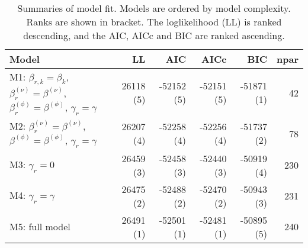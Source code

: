 \begin{table}[ht]
\centering
\begingroup\fontsize{9pt}{10pt}\selectfont
\begin{tabular}{l|rrrrr}
  \hline
Model & LL & AIC & AICc & BIC & npar \\ 
  \hline
M1: $\beta_{r,k} = \beta_{k}$, $\beta_{r}^{(\nu)} = \beta^{(\nu)}$, $\beta_{r}^{(\phi)} = \beta^{(\phi)}$, $\gamma_r = \gamma$ & 26118 (5) & -52152 (5) & -52151 (5) & -51871 (1) & 42 \\ 
  M2: $\beta_{r}^{(\nu)} = \beta^{(\nu)}$, $\beta^{(\phi)} = \beta^{(\phi)}$, $\gamma_r = \gamma$ & 26207 (4) & -52258 (4) & -52256 (4) & -51737 (2) & 78 \\ 
  M3: $\gamma_r = 0$ & 26459 (3) & -52458 (3) & -52440 (3) & -50919 (4) & 230 \\ 
  M4: $\gamma_r = \gamma$ & 26475 (2) & -52488 (2) & -52470 (2) & -50943 (3) & 231 \\ 
  M5: full model & 26491 (1) & -52501 (1) & -52481 (1) & -50895 (5) & 240 \\ 
   \hline
\end{tabular}
\endgroup
\caption{Summaries of model fit.
             Models are ordered by model complexity.
             Ranks are shown in bracket.
             The loglikelihood (LL) is ranked descending,
             and the AIC, AICc and BIC are ranked ascending.} 
\label{tab:mBetafit}
\end{table}
